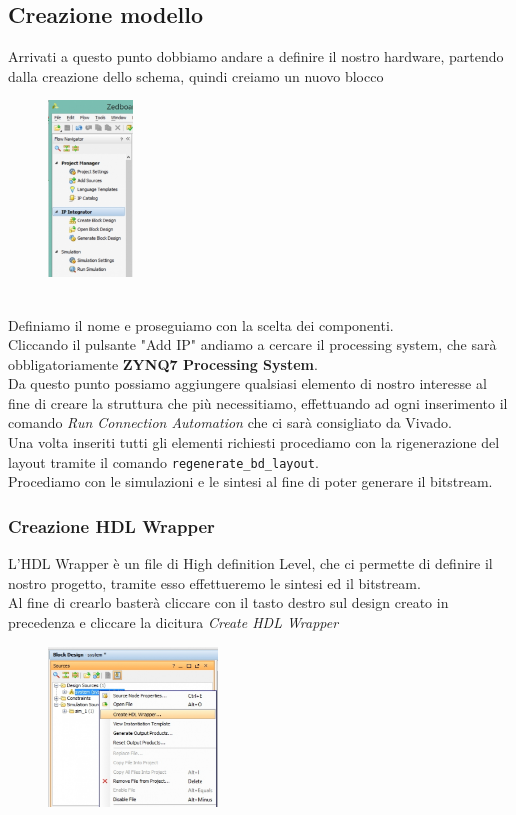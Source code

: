 \subsection{Creazione modello}
Arrivati a questo punto dobbiamo andare a definire il nostro hardware, partendo dalla creazione dello schema, quindi creiamo un nuovo blocco 
\begin{figure}[h]
\centering
\includegraphics[width=0.2\textwidth]{images/image_7.jpg}
\end{figure}\\
Definiamo il nome e proseguiamo con la scelta dei componenti.\\
Cliccando il pulsante "Add IP" andiamo a cercare il processing system, che sarà obbligatoriamente \textbf{ZYNQ7 Processing System}.\\
Da questo punto possiamo aggiungere qualsiasi elemento di nostro interesse al fine di creare la struttura che più necessitiamo, effettuando ad ogni inserimento il comando \textit{Run Connection Automation} che ci sarà consigliato da Vivado.\\
Una volta inseriti tutti gli elementi richiesti procediamo con la rigenerazione del layout tramite il comando \verb|regenerate_bd_layout|.\\
Procediamo con le simulazioni e le sintesi al fine di poter generare il bitstream.
\subsubsection{Creazione HDL Wrapper}
L'HDL Wrapper è un file di High definition Level, che ci permette di definire il nostro progetto, tramite esso effettueremo le sintesi ed il bitstream.\\
Al fine di crearlo basterà cliccare con il tasto destro sul design creato in precedenza e cliccare la dicitura \textit{Create HDL Wrapper}
\begin{figure}[h]
\centering
\includegraphics[width=0.4\textwidth]{images/image_20.jpg}
\end{figure}\\
